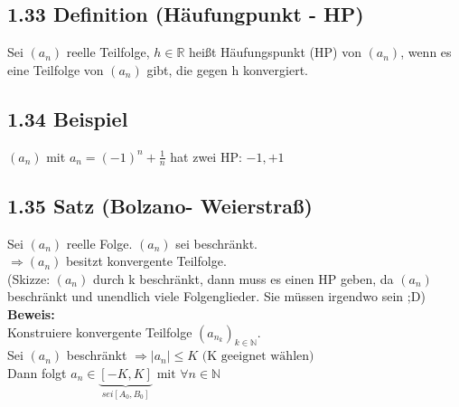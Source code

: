 \documentclass[12pt]{article}
\begin{document}
\subsection*{1.33 Definition (Häufungpunkt - HP)}
Sei $(a_n) $ reelle Teilfolge, $h\in \mathbb{R}$ heißt Häufungspunkt (HP) von $(a_n) $, wenn es eine Teilfolge von $(a_n) $ gibt, die gegen h konvergiert. 


\subsection*{1.34 Beispiel}
$(a_n) $ mit $a_n = (-1)^n + \frac{1}{n}$ hat zwei HP: $-1, +1$



\subsection*{1.35 Satz (Bolzano- Weierstraß)}
Sei $(a_n) $ reelle Folge. $(a_n) $ sei beschränkt. \\
$\Rightarrow (a_n) $ besitzt konvergente Teilfolge. \\
(Skizze: $(a_n) $  durch k beschränkt, dann muss es einen HP geben, da $(a_n) $  beschränkt und unendlich viele Folgenglieder. Sie müssen irgendwo sein ;D)\\
\textbf{Beweis:}\\
Konstruiere konvergente Teilfolge $(a_{n_k})_{k \in \mathbb{N}}$.\\
Sei $(a_n) $ beschränkt $\Rightarrow |a_n| \leq K \text{ (K geeignet wählen)}$\\
Dann folgt $a_n \in \underbrace{[-K,K]}_{sei [A_0, B_0]} \text{ mit } \forall n \in \mathbb{N}$ 
\end{document}
